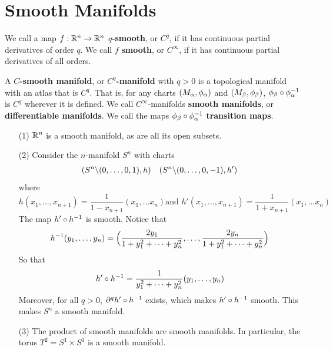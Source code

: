 \section{Smooth Manifolds}

\begin{definition}
    We call a map $f:\mathbb{R}^n \xrightarrow{} \mathbb{R}^n$ \textbf{$q$-smooth}, or $C^q$, if
    it has continuous partial derivatives of order  $q$. We call  $f$
    \textbf{smooth}, or $C^\infty$, if it has continuous partial derivatives of
    all orders.
\end{definition}

\begin{definition}
    A \textbf{$C$-smooth manifold}, or  \textbf{$C^q$-manifold} with $q>0$ is a
    topological manifold with an atlas that is  $C^q$. That is, for any charts
    $(M_\alpha,\phi_\alpha)$ and $(M_\beta,\phi_\beta)$, $\phi_\beta \circ \phi_\alpha^{-1}$ is $C^q$
    wherever it is defined. We call  $C^\infty$-manifolds  \textbf{smooth manifolds},
    or \textbf{differentiable manifolds}. We call the maps $\phi_\beta \circ
    \phi_\alpha^{-1}$ \textbf{transition maps}.
\end{definition}

\begin{example}\label{example_1.6}
    \begin{enumerate}
        \item[(1)] $\mathbb{R}^n$ is a smooth manifold, as are all its open subsets.

        \item[(2)] Consider the $n$-manifold  $S^n$ with charts
            \begin{align*}
                (S^n \backslash (0, \dots, 0,1),h) && (S^n \backslash (0, \dots, 0,-1),h')  \\
            \end{align*}
            where
            \begin{equation*}
                h(x_1, \dots,x_{n+1})=\frac{1}{1-x_{n+1}}(x_1, \dots x_n) \text{
                and } h'(x_1, \dots,x_{n+1})=\frac{1}{1+x_{n+1}}(x_1, \dots x_n)
            \end{equation*}
            The map $h' \circ h^{-1}$ is smooth. Notice that
            \begin{equation*}
                h^{-1}(y_1, \dots,y_n)=\Big{(}\frac{2y_1}{1+y_1^2+\dots+y_n^2},
                \dots, \frac{2y_n}{1+y_1^2+\dots+y_n^2}\Big{)}
            \end{equation*}
            So that
            \begin{equation*}
                h' \circ h^{-1}=\frac{1}{y_1^2+\dots+y_n^2}(y_1, \dots, y_n)
            \end{equation*}
            Moreover, for all $q>0$, $\partial^q{h' \circ h^{-1}}$ exists,
            which makes $h' \circ h^{-1}$ smooth. This makes $S^n$ a smooth
            manifold.

        \item[(3)] The product of smooth manifolds are smooth manifolds. In
            particular, the torus $T^2=S^1 \times S^1$ is a smooth manifold.
    \end{enumerate}
\end{example}


